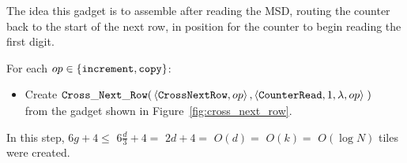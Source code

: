 
\subsubsection{\crossnextrow}

The idea this gadget is to assemble after reading the MSD, routing the counter back to the start of the
next row, in position for the counter to begin reading the first digit.

\vspace{.5cm}
For each $op\in \{ {\tt increment}, {\tt copy} \}$:

\begin{itemize}
    \item Create
    $\begin{aligned}[t]
        {\tt Cross\_Next\_Row}(&\left\langle {\tt CrossNextRow},                   op \right\rangle,
                       \left\langle {\tt CounterRead},        1, \lambda, op \right\rangle \;)
    \end{aligned}$\\from the gadget shown in Figure~\ref{fig:cross_next_row}.
\end{itemize}
%
In this step, $6g + 4 \leq$
%
$6 \frac{d}{3} + 4 =$
%
$2d + 4 =$
%
$O\left( d \right) =$
%
$O\left( k \right) =$
%
$O\left( {\log N} \right)$ tiles were created.
%

